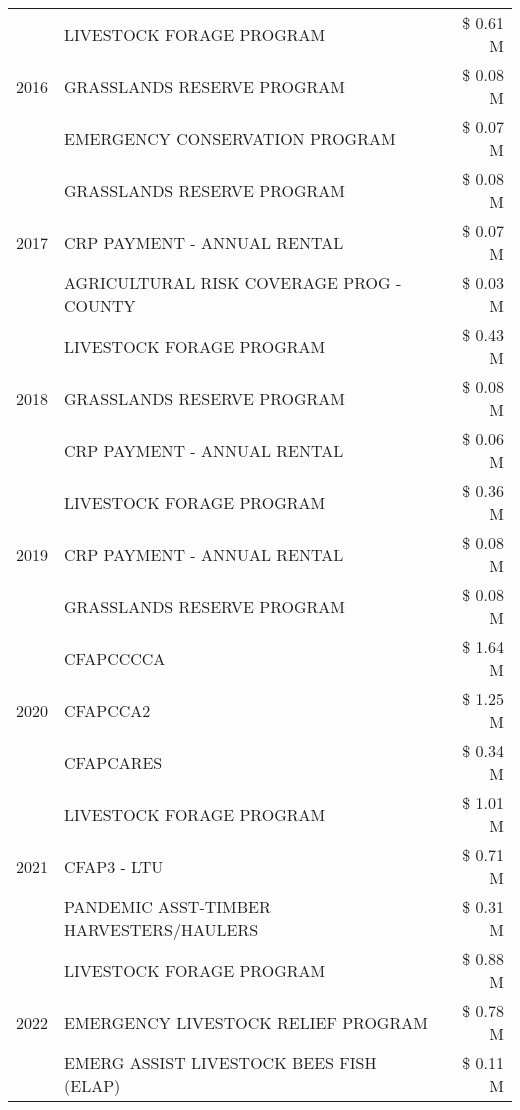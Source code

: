 \begin{tabular}{llr}
\cline{1-3}
\multirow[t]{3}{*}{2016} & LIVESTOCK FORAGE PROGRAM & \$ 0.61 M \\
 & GRASSLANDS RESERVE PROGRAM & \$ 0.08 M \\
 & EMERGENCY CONSERVATION PROGRAM & \$ 0.07 M \\
\cline{1-3}
\multirow[t]{3}{*}{2017} & GRASSLANDS RESERVE PROGRAM & \$ 0.08 M \\
 & CRP PAYMENT - ANNUAL RENTAL & \$ 0.07 M \\
 & AGRICULTURAL RISK COVERAGE PROG - COUNTY & \$ 0.03 M \\
\cline{1-3}
\multirow[t]{3}{*}{2018} & LIVESTOCK FORAGE PROGRAM & \$ 0.43 M \\
 & GRASSLANDS RESERVE PROGRAM & \$ 0.08 M \\
 & CRP PAYMENT - ANNUAL RENTAL & \$ 0.06 M \\
\cline{1-3}
\multirow[t]{3}{*}{2019} & LIVESTOCK FORAGE PROGRAM & \$ 0.36 M \\
 & CRP PAYMENT - ANNUAL RENTAL & \$ 0.08 M \\
 & GRASSLANDS RESERVE PROGRAM & \$ 0.08 M \\
\cline{1-3}
\multirow[t]{3}{*}{2020} & CFAPCCCCA & \$ 1.64 M \\
 & CFAPCCA2 & \$ 1.25 M \\
 & CFAPCARES & \$ 0.34 M \\
\cline{1-3}
\multirow[t]{3}{*}{2021} & LIVESTOCK FORAGE PROGRAM & \$ 1.01 M \\
 & CFAP3 - LTU & \$ 0.71 M \\
 & PANDEMIC ASST-TIMBER HARVESTERS/HAULERS & \$ 0.31 M \\
\cline{1-3}
\multirow[t]{3}{*}{2022} & LIVESTOCK FORAGE PROGRAM & \$ 0.88 M \\
 & EMERGENCY LIVESTOCK RELIEF PROGRAM & \$ 0.78 M \\
 & EMERG ASSIST LIVESTOCK BEES FISH (ELAP) & \$ 0.11 M \\
\cline{1-3}
\bottomrule
\end{tabular}
